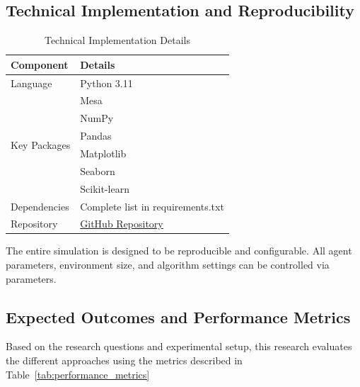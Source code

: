 \documentclass[11pt, a4paper]{article}
\begin{document}
\subsection{Technical Implementation and Reproducibility}
\label{Technical Implementation and Reproducibility}
\begin{table}[htbp]
\small
\centering
\caption{Technical Implementation Details}
\label{tab:technical_implementation}
\begin{tabular}{@{}ll@{}}
\toprule
\textbf{Component} & \textbf{Details} \\
\midrule
Language & Python 3.11 \citep{python3.11} \\
\midrule
\multirow{6}{*}{Key Packages} & Mesa \citep{terMesa} \\
& NumPy \citep{numpy} \\
& Pandas \citep{reback2020pandas} \\
& Matplotlib \citep{Matplotlib} \\
& Seaborn \citep{seaborn} \\
& Scikit-learn \citep{scikit-learn} \\
\midrule
Dependencies & Complete list in requirements.txt \\
\midrule
Repository & \href{https://github.com/kaispeidel/thesis}{GitHub Repository} \citep{AgentBasedFirefightingModel_repository} \\
\bottomrule
\end{tabular}
\end{table}
The entire simulation is designed to be reproducible and configurable. All agent parameters, environment size, and algorithm settings can be controlled via parameters.

\subsection{Expected Outcomes and Performance Metrics}
\label{Expected Outcomes and Performance Metrics}
Based on the research questions and experimental setup, this research evaluates the different approaches using the metrics described in Table~\ref{tab:performance_metrics}
\end{document}
